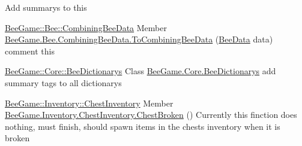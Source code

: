 
\begin{DoxyRefList}
\item[\label{todo__todo000001}%
\Hypertarget{todo__todo000001}%
Class \hyperlink{class_bee_game_1_1_bee_1_1_apiary}{Bee\+Game.Bee.Apiary} ]Add summarys to this 
\end{DoxyRefList}

\label{todo__todo000002}%
%
 \hyperlink{struct_bee_game_1_1_bee_1_1_combining_bee_data}{Bee\+Game\+::\+Bee\+::\+Combining\+Bee\+Data} Member \hyperlink{struct_bee_game_1_1_bee_1_1_combining_bee_data_abdf4646728337da76097aed9b74347ae}{Bee\+Game.Bee.Combining\+Bee\+Data.To\+Combining\+Bee\+Data} (\hyperlink{struct_bee_game_1_1_bee_1_1_bee_data}{Bee\+Data} data) comment this 

\label{todo__todo000003}%
%
 \hyperlink{class_bee_game_1_1_core_1_1_bee_dictionarys}{Bee\+Game\+::\+Core\+::\+Bee\+Dictionarys} Class \hyperlink{class_bee_game_1_1_core_1_1_bee_dictionarys}{Bee\+Game.Core.Bee\+Dictionarys}  add summary tags to all dictionarys 

\label{todo__todo000004}%
%
 \hyperlink{class_bee_game_1_1_inventory_1_1_chest_inventory}{Bee\+Game\+::\+Inventory\+::\+Chest\+Inventory} Member \hyperlink{class_bee_game_1_1_inventory_1_1_chest_inventory_a9d38ab66a63c4d54bbba631e267a7149}{Bee\+Game.Inventory.Chest\+Inventory.Chest\+Broken} () Currently this finction does nothing, must finish, should spawn items in the chests inventory when it is broken 